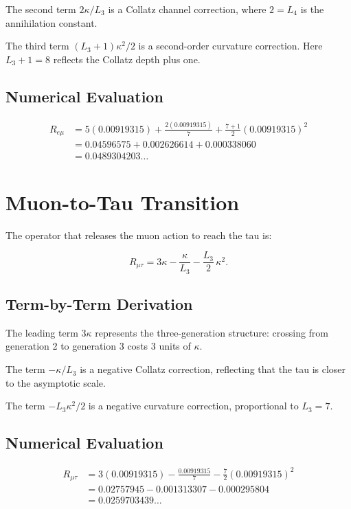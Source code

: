 The second term \(2\kappa/L_3\) is a Collatz channel correction,
where \(2 = L_4\) is the annihilation constant.

The third term \((L_3+1)\kappa^2/2\) is a second-order curvature correction.
Here \(L_3+1 = 8\) reflects the Collatz depth plus one.

\subsection{Numerical Evaluation}

\[
\begin{aligned}
R_{e\mu} &= 5(0.00919315) + \frac{2(0.00919315)}{7}
           + \frac{7+1}{2}(0.00919315)^2 \\[4pt]
        &= 0.04596575 + 0.002626614 + 0.000338060 \\[4pt]
        &= 0.0489304203\ldots
\end{aligned}
\]

\section{Muon-to-Tau Transition}

The operator that releases the muon action to reach the tau is:

\begin{equation}
R_{\mu\tau} = 3\kappa - \frac{\kappa}{L_3} - \frac{L_3}{2}\,\kappa^2.
\label{eq:Rmt}
\end{equation}

\subsection{Term-by-Term Derivation}

The leading term \(3\kappa\) represents the three-generation structure:
crossing from generation 2 to generation 3 costs 3 units of \(\kappa\).

The term \(-\kappa/L_3\) is a negative Collatz correction, reflecting that
the tau is closer to the asymptotic scale.

The term \(-L_3\kappa^2/2\) is a negative curvature correction,
proportional to \(L_3 = 7\).

\subsection{Numerical Evaluation}

\[
\begin{aligned}
R_{\mu\tau} &= 3(0.00919315) - \frac{0.00919315}{7}
              - \frac{7}{2}(0.00919315)^2 \\[4pt]
           &= 0.02757945 - 0.001313307 - 0.000295804 \\[4pt]
           &= 0.0259703439\ldots
\end{aligned}
\]

